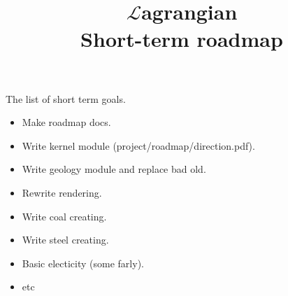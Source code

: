 \documentclass[12pt]{article}
\title{$\mathcal{L}$agrangian \\ Short-term roadmap}
\begin{document}
	\maketitle

	The list of short term goals.

    \begin{itemize}
		\item Make roadmap docs.
		\item Write kernel module (project/roadmap/direction.pdf).
		\item Write geology module and replace bad old.
		\item Rewrite rendering.
		\item Write coal creating.
		\item Write steel creating.
		\item Basic electicity (some farly).
		\item etc
	\end{itemize}
\end{document}

